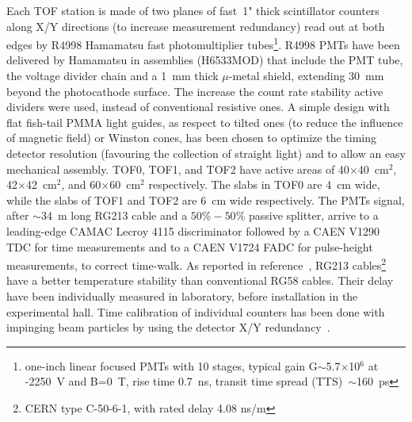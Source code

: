 Each TOF station is made of two planes of fast~1" thick scintillator counters 
along X/Y directions (to increase measurement redundancy) read out at both edges by
R4998 Hamamatsu fast photomultiplier tubes\footnote{one-inch linear 
focused PMTs with 10 stages, typical gain G$\sim$5.7$\times$10$^6$ 
at -2250~V and B=0~T, rise time 0.7~ns, transit time spread (TTS)~$\sim$160~ps}. 
R4998 PMTs have been delivered by Hamamatsu in assemblies (H6533MOD) that
include the PMT tube, the voltage divider chain and a 1~mm thick $\mu$-metal
shield, extending 30~mm beyond the photocathode surface. 
The increase the count rate stability active dividers were used, instead of
conventional resistive ones.
A simple design with flat fish-tail PMMA light guides, as respect to tilted ones
(to reduce the influence of magnetic field) or Winston cones, has
been chosen to optimize the timing detector resolution (favouring
the collection of straight light) and to allow an easy mechanical 
assembly. 
TOF0, TOF1, and TOF2 have active areas of 40$\times$40~cm$^2$, 42$\times$42~cm$^2$, and 60$\times$60~cm$^2$ respectively.
The slabs in TOF0 are 4~cm wide, while the slabs of TOF1 and TOF2 are 6~cm wide respectively.
The PMTs signal, after $\sim$34~m long RG213 cable and a $50\%-50\%$ passive
splitter, arrive to a leading-edge CAMAC Lecroy 4115 discriminator 
followed by a CAEN V1290 TDC for time measurements and to a CAEN V1724 FADC
for pulse-height measurements, to correct time-walk. As reported in 
reference~\cite{NOTE241}, RG213 cables\footnote{CERN type C-50-6-1, with
rated delay 4.08 ns/m} have a better temperature stability
than conventional RG58 cables. Their delay have been individually measured
in laboratory, before installation in the experimental hall.  
Time calibration of individual counters has been done with impinging beam particles by using the detector
X/Y redundancy~\cite{NOTE251}.

